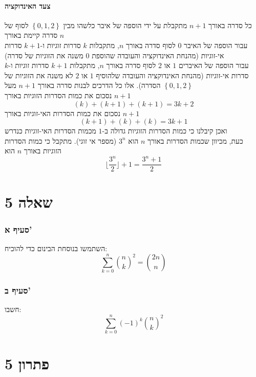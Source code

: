 \documentclass[12pt, titlepage]{article}
\begin{document}
\subsection*{צעד האינדוקציה}
כל סדרה באורך $n+1$ מתקבלת על ידי הוספה של איבר כלשהו מבין $\left\{0,1,2\right\}$ לסוף של סדרה קיימת באורך $n$\\
עבור הוספה של האיבר $0$ לסוף סדרה באורך $n$, מתקבלות $k$ סדרות זוגיות ו-$k+1$ סדרות אי-זוגיות (מהנחת האינדוקציה והעובדה שהוספת $0$ משנה את הזוגיות של סדרה)\\
עבור הוספה של האיברים $1$ או $2$ לסוף סדרה באורך $n$, מתקבלות $k+1$ סדרות זוגיות ו-$k$ סדרות אי-זוגיות (מהנחת האינדוקציה והעובדה שלהוסיף $1$ או $2$ לא משנה את הזוגיות של הסדרה). אלו כל הדרכים לבנות סדרה באורך $n+1$ מעל $\left\{0,1,2\right\}$\\
נסכום את כמות הסדרות הזוגיות באורך $n+1$
\[
    \left(k\right) + \left(k+1\right) + \left(k+1\right) = 3k+2
\]
נסכום את כמות הסדרות האי-זוגיות באורך $n+1$
\[
    \left(k+1\right) + \left(k\right) + \left(k\right) = 3k+1
\]
ואכן קיבלנו כי כמות הסדרות הזוגיות גדולה ב-$1$ מכמות הסדרות האי-זוגיות כנדרש\\
כעת, מכיוון שכמות הסדרות באורך $n$ הוא $3^n$ (מספר אי זוגי). מתקבל כי כמות הסדרות הזוגיות באורך $n$ הוא
\[
    \boxed{  \lfloor \frac{3^n}{2}\rfloor+1 = \frac{3^n+1}{2}}
\]
\newpage
\part*{שאלה 5}
\section*{סעיף א'}
השתמשו בנוסחת הבינום כדי להוכיח:
\[
    \sum_{k=0}^{n} \binom{n}{k}^2 = \binom{2n}{n}
\]
\section*{סעיף ב'}
חשבו:
\[
    \sum_{k=0}^{n} \left(-1\right)^k \binom{n}{k}^2
\]
\part*{פתרון 5}
\end{document}
